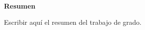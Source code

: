 \rhead{}
\lhead{}
\renewcommand{\headrulewidth}{0pt}
\begin{center}
    \Large
    \textbf{\newtitle}
    
    \large
    \vspace{0.4cm}
    \newauthor
    \vspace{0.9cm}
    
    \textbf{Resumen}\\
\end{center}
Escribir aquí el resumen del trabajo de grado.
